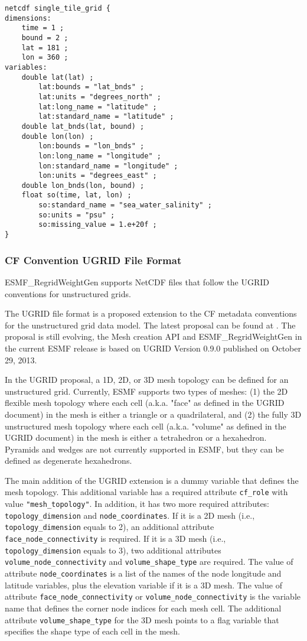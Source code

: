 \begin{verbatim}
netcdf single_tile_grid {
dimensions:
	time = 1 ;
	bound = 2 ;
	lat = 181 ;
	lon = 360 ;
variables:
	double lat(lat) ;
		lat:bounds = "lat_bnds" ;
		lat:units = "degrees_north" ;
		lat:long_name = "latitude" ;
		lat:standard_name = "latitude" ;
	double lat_bnds(lat, bound) ;
	double lon(lon) ;
		lon:bounds = "lon_bnds" ;
		lon:long_name = "longitude" ;
		lon:standard_name = "longitude" ;
		lon:units = "degrees_east" ;
	double lon_bnds(lon, bound) ;
	float so(time, lat, lon) ;
		so:standard_name = "sea_water_salinity" ;
		so:units = "psu" ;
		so:missing_value = 1.e+20f ;
}
\end{verbatim}

\subsubsection{CF Convention UGRID File Format}\label{sec:fileformat:ugrid}

ESMF\_RegridWeightGen supports NetCDF files that follow the UGRID conventions for unstructured grids.

The UGRID file format is a proposed extension to the CF metadata conventions for the unstructured grid data model. The latest proposal can be found at .  The proposal is still evolving, the Mesh creation API and ESMF\_RegridWeightGen in the current ESMF release is based on UGRID Version 0.9.0 published on October 29, 2013.

In the UGRID proposal, a 1D, 2D, or 3D mesh topology can be defined for an unstructured grid.  Currently, ESMF
supports two types of meshes: (1) the 2D flexible mesh topology where each cell (a.k.a. "face" as defined in the UGRID document) in the mesh is either a triangle or a quadrilateral, and (2) the fully 3D unstructured mesh topology where each cell (a.k.a. "volume" as defined in the UGRID document) in the mesh
is either a tetrahedron or a hexahedron.  Pyramids and wedges are not currently supported in ESMF, but they
can be defined as degenerate hexahedrons.   

The main addition of the UGRID extension is a dummy variable that defines the mesh
topology.  This additional variable has a required attribute {\tt cf\_role} with value {\tt "mesh\_topology"}.  In addition, it has two more required attributes: {\tt topology\_dimension}
and {\tt node\_coordinates}.  If it is a 2D mesh (i.e., {\tt topology\_dimension} equals to 2), an additional attribute
{\tt face\_node\_connectivity} is required.  If it is a 3D mesh (i.e., {\tt topology\_dimension} equals to 3), two additional attributes {\tt volume\_node\_connectivity} and {\tt volume\_shape\_type} are required.
The value of attribute {\tt node\_coordinates} is a list of the names of the node longitude and latitude variables,
plus the elevation variable if it is a 3D mesh.
The value of attribute {\tt face\_node\_connectivity} or {\tt volume\_node\_connectivity} is the variable name that defines the corner node indices for each mesh cell. The additional attribute {\tt volume\_shape\_type} for the
3D mesh points to a flag variable that specifies the shape type of each cell in the mesh.

